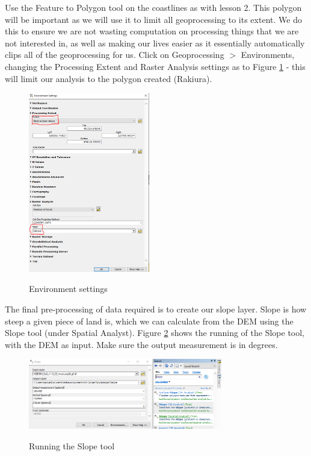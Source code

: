 \documentclass{article}
\begin{document}
Use the Feature to Polygon tool on the coastlines as with lesson 2. This polygon will be important as we will use it to limit all geoprocessing to its extent. We do this to ensure we are not wasting computation on processing things that we are not interested in, as well as making our lives easier as it essentially automatically clips all of the geoprocessing for us. Click on Geoprocessing $>$ Environments, changing the Processing Extent and Raster Analysis settings as to Figure \ref{3_environments} - this will limit our analysis to the polygon created (Rakiura).
\pagebreak

\begin{figure}[h]
  \centering
  \caption{Environment settings}
  \includegraphics[width=200px]{images/part3/environments.PNG}
  \label{3_environments}
\end{figure}

The final pre-processing of data required is to create our slope layer. Slope is how steep a given piece of land is, which we can calculate from the DEM using the Slope tool (under Spatial Analyst). Figure \ref{3_slope} shows the running of the Slope tool, with the DEM as input. Make sure the output measurement is in degrees. \\

\begin{figure}[h]
  \centering
  \caption{Running the Slope tool}
  \includegraphics[width=320px]{images/part3/slope.PNG}
  \label{3_slope}
\end{figure}
\pagebreak
\end{document}
